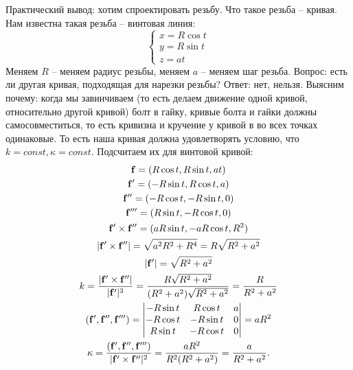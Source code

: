 \documentclass[main]{subfiles}
\begin{document}
Практический вывод:
хотим спроектировать резьбу.
Что такое резьба -- кривая.
Нам известна такая резьба -- винтовая линия:
\[\begin{cases}
        x = R \cos t \\
        y = R \sin t \\
        z = at
    \end{cases}\]
Меняем $R$ -- меняем радиус резьбы, меняем $a$ -- меняем шаг резьба.
Вопрос: есть ли другая кривая, подходящая для нарезки резьбы?
Ответ: нет, нельзя.
Выясним почему:
когда мы завинчиваем
(то есть делаем движение одной кривой, относительно другой кривой)
болт в гайку, кривые болта и гайки должны самосовместиться, то есть кривизна и кручение у кривой в во всех точках одинаковые.
То есть наша кривая должна удовлетворять условию, что $k = const, \kappa = const$.
Подсчитаем их для винтовой кривой:
\begin{gather*}
    \mathbf{f} = (R\cos t, R \sin t, at)\\
    \mathbf{f}' = (-R \sin t, R \cos t, a) \\
    \mathbf{f}'' = (-R \cos t, - R \sin t, 0)\\
    \mathbf{f}''' = (R \sin t, -R \cos t, 0) \\
    \mathbf{f}' \times \mathbf{f}'' = (aR \sin t, - aR \cos t, R^2)\\
    |\mathbf{f}' \times \mathbf{f}''| = \sqrt{a^2 R^2 + R^4} = R \sqrt{R^2 + a^2}\\
    |\mathbf{f}'| = \sqrt{R^2 + a^2}\\
    k = \frac{|\mathbf{f}' \times \mathbf{f}''|}{|\mathbf{f}'|^3} = \frac{R \sqrt{R^2 + a^2}}{(R^2 + a^2) \sqrt{R^2 + a^2}} = \frac{R}{R^2 + a^2}\\
    (\mathbf{f}', \mathbf{f}'', \mathbf{f}''') = \begin{vmatrix}
        -R \sin t & R \cos t   & a \\
        -R \cos t & - R \sin t & 0 \\
        R \sin t  & - R \cos t & 0
    \end{vmatrix} = aR^2\\
    \kappa =\frac{(\mathbf{f}', \mathbf{f}'', \mathbf{f}''')}{|\mathbf{f}' \times \mathbf{f}''|^2} = \frac{aR^2}{R^2 (R^2+ a^2)} = \frac{a}{R^2 + a^2}.
\end{gather*}
\end{document}
